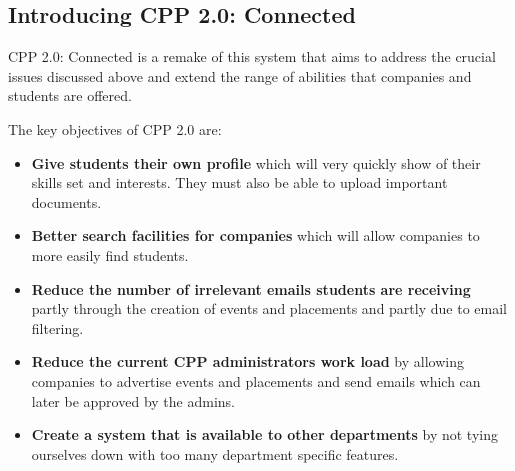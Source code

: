\subsection{Introducing CPP 2.0: Connected}
CPP 2.0: Connected is a remake of this system that aims to address the crucial issues discussed above and extend the range of abilities that companies and students are offered.

The key objectives of CPP 2.0 are:
\begin{itemize}
  \item \textbf{Give students their own profile} which will very quickly show of their skills set and interests. They must also be able to upload important documents.
  \item \textbf{Better search facilities for companies} which will allow companies to more easily find students.
  \item \textbf{Reduce the number of irrelevant emails students are receiving} partly through the creation of events and placements and partly due to email filtering.
  \item \textbf{Reduce the current CPP administrators work load} by allowing companies to advertise events and placements and send emails which can later be approved by the admins.
  \item \textbf{Create a system that is available to other departments} by not tying ourselves down with too many department specific features.
\end{itemize}